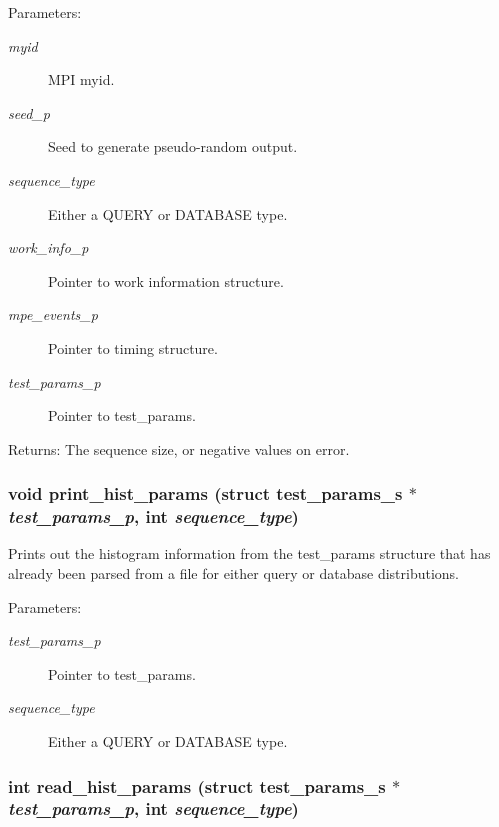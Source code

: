 \begin{Desc}
\item[Parameters:]
\begin{description}
\item[{\em myid}]MPI myid. \item[{\em seed\_\-p}]Seed to generate pseudo-random output. \item[{\em sequence\_\-type}]Either a QUERY or DATABASE type. \item[{\em work\_\-info\_\-p}]Pointer to work information structure. \item[{\em mpe\_\-events\_\-p}]Pointer to timing structure. \item[{\em test\_\-params\_\-p}]Pointer to test\_\-params. \end{description}
\end{Desc}
\begin{Desc}
\item[Returns:]The sequence size, or negative values on error. \end{Desc}
\subsubsection{\setlength{\rightskip}{0pt plus 5cm}void print\_\-hist\_\-params (struct \bf{test\_\-params\_\-s} $\ast$ {\em test\_\-params\_\-p}, int {\em sequence\_\-type})}\label{hist__params_8h_13fbbe5d74468cabdd99bf1a14929f8a}


Prints out the histogram information from the test\_\-params structure that has already been parsed from a file for either query or database distributions.

\begin{Desc}
\item[Parameters:]
\begin{description}
\item[{\em test\_\-params\_\-p}]Pointer to test\_\-params. \item[{\em sequence\_\-type}]Either a QUERY or DATABASE type. \end{description}
\end{Desc}
\subsubsection{\setlength{\rightskip}{0pt plus 5cm}int read\_\-hist\_\-params (struct \bf{test\_\-params\_\-s} $\ast$ {\em test\_\-params\_\-p}, int {\em sequence\_\-type})}\label{hist__params_8h_eda2c8a6530c1e87795e1a645c88cd38}


